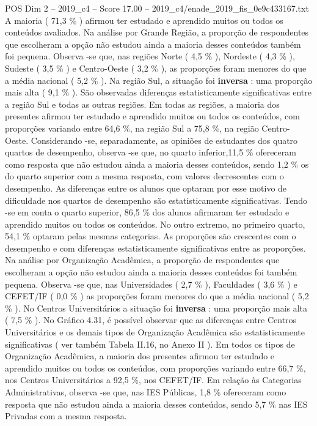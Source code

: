 \begin{textsample}{POS Dim 2 – 2019\_c4 – Score 17.00 – 2019\_c4/enade\_2019\_fis\_0e9c433167.txt}
A maioria ( 71,3 \% ) afirmou ter estudado e aprendido muitos ou todos os conteúdos avaliados.
Na análise por Grande Região, a proporção de respondentes que escolheram a opção não estudou ainda a maioria desses conteúdos também foi pequena.
Observa -se que, nas regiões Norte ( 4,5 \% ), Nordeste ( 4,3 \% ), Sudeste ( 3,5 \% ) e Centro-Oeste ( 3,2 \% ), as proporções foram menores do que a média nacional ( 5,2 \% ).
Na região Sul, a situação foi \textbf{inversa} : uma proporção mais alta ( 9,1 \% ).
São observadas diferenças estatisticamente significativas entre a região Sul e todas as outras regiões.
Em todas as regiões, a maioria dos presentes afirmou ter estudado e aprendido muitos ou todos os conteúdos, com proporções variando entre 64,6 \%, na região Sul a 75,8 \%, na região Centro-Oeste.
Considerando -se, separadamente, as opiniões de estudantes dos quatro quartos de desempenho, observa -se que, no quarto inferior,11,5 \% ofereceram como resposta que não estudou ainda a maioria desses conteúdos, sendo 1,2 \% os do quarto superior com a mesma resposta, com valores decrescentes com o desempenho.
As diferenças entre os alunos que optaram por esse motivo de dificuldade nos quartos de desempenho são estatisticamente significativas.
Tendo -se em conta o quarto superior, 86,5 \% dos alunos afirmaram ter estudado e aprendido muitos ou todos os conteúdos.
No outro extremo, no primeiro quarto, 54,1 \% optaram pelas mesmas categorias.
As proporções são crescentes com o desempenho e com diferenças estatisticamente significativas entre as proporções.
Na análise por Organização Acadêmica, a proporção de respondentes que escolheram a opção não estudou ainda a maioria desses conteúdos foi também pequena.
Observa -se que, nas Universidades ( 2,7 \% ), Faculdades ( 3,6 \% ) e CEFET/IF ( 0,0 \% ) as proporções foram menores do que a média nacional ( 5,2 \% ).
No Centros Universitários a situação foi \textbf{inversa} : uma proporção mais alta ( 7,5 \% ).
No Gráfico 4.31, é possível observar que as diferenças entre Centros Universitários e os demais tipos de Organização Acadêmica são estatisticamente significativas ( ver também Tabela II.16, no Anexo II ).
Em todos os tipos de Organização Acadêmica, a maioria dos presentes afirmou ter estudado e aprendido muitos ou todos os conteúdos, com proporções variando entre 66,7 \%, nos Centros Universitários a 92,5 \%, nos CEFET/IF.
Em relação às Categorias Administrativas, observa -se que, nas IES Públicas, 1,8 \% ofereceram como resposta que não estudou ainda a maioria desses conteúdos, sendo 5,7 \% nas IES Privadas com a mesma resposta.

\end{textsample}
